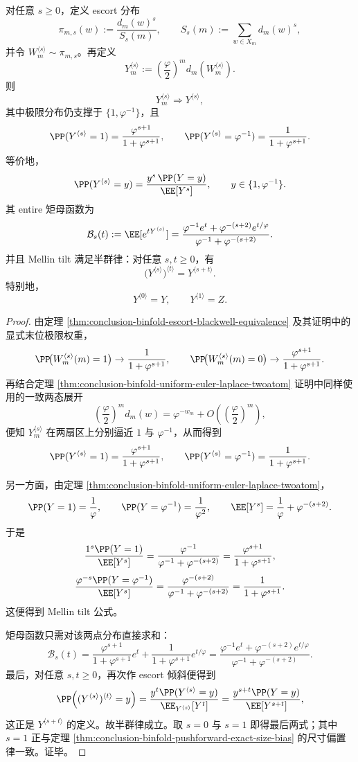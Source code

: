 \begin{theorem}\label{thm:conclusion-binfold-mellin-escort-semigroup}
对任意 \(s\ge 0\)，定义 escort 分布
\[
\pi_{m,s}(w):=\frac{d_m(w)^s}{S_s(m)},
\qquad
S_s(m):=\sum_{w\in X_m}d_m(w)^s,
\]
并令 \(W_m^{\langle s\rangle}\sim \pi_{m,s}\)。再定义
\[
Y_m^{\langle s\rangle}
:=
\left(\frac{\varphi}{2}\right)^m d_m\!\left(W_m^{\langle s\rangle}\right).
\]
则
\[
Y_m^{\langle s\rangle}\Rightarrow Y^{\langle s\rangle},
\]
其中极限分布仍支撑于 \(\{1,\varphi^{-1}\}\)，且
\[
\PP(Y^{\langle s\rangle}=1)=\frac{\varphi^{s+1}}{1+\varphi^{s+1}},
\qquad
\PP(Y^{\langle s\rangle}=\varphi^{-1})=\frac{1}{1+\varphi^{s+1}}.
\]
等价地，
\[
\PP(Y^{\langle s\rangle}=y)
=
\frac{y^s\,\PP(Y=y)}{\EE[Y^s]},
\qquad
y\in\{1,\varphi^{-1}\}.
\]
其 entire 矩母函数为
\[
\mathcal B_s(t):=\EE[e^{tY^{\langle s\rangle}}]
=
\frac{\varphi^{-1}e^t+\varphi^{-(s+2)}e^{t/\varphi}}
{\varphi^{-1}+\varphi^{-(s+2)}}.
\]
并且 Mellin tilt 满足半群律：对任意 \(s,t\ge 0\)，有
\[
\bigl(Y^{\langle s\rangle}\bigr)^{\langle t\rangle}=Y^{\langle s+t\rangle}.
\]
特别地，
\[
Y^{\langle 0\rangle}=Y,
\qquad
Y^{\langle 1\rangle}=Z.
\]
\end{theorem}
\begin{proof}
由定理 \ref{thm:conclusion-binfold-escort-blackwell-equivalence} 及其证明中的显式末位极限权重，
\[
\PP\!\bigl(W_m^{\langle s\rangle}(m)=1\bigr)\to \frac{1}{1+\varphi^{s+1}},
\qquad
\PP\!\bigl(W_m^{\langle s\rangle}(m)=0\bigr)\to \frac{\varphi^{s+1}}{1+\varphi^{s+1}}.
\]
再结合定理 \ref{thm:conclusion-binfold-uniform-euler-laplace-twoatom} 证明中同样使用的一致两态展开
\[
\left(\frac{\varphi}{2}\right)^m d_m(w)
=
\varphi^{-w_m}+O\!\left(\left(\frac{\varphi}{2}\right)^m\right),
\]
便知 \(Y_m^{\langle s\rangle}\) 在两扇区上分别逼近 \(1\) 与 \(\varphi^{-1}\)，从而得到
\[
\PP(Y^{\langle s\rangle}=1)=\frac{\varphi^{s+1}}{1+\varphi^{s+1}},
\qquad
\PP(Y^{\langle s\rangle}=\varphi^{-1})=\frac{1}{1+\varphi^{s+1}}.
\]

另一方面，由定理 \ref{thm:conclusion-binfold-uniform-euler-laplace-twoatom}，
\[
\PP(Y=1)=\frac{1}{\varphi},
\qquad
\PP(Y=\varphi^{-1})=\frac{1}{\varphi^2},
\qquad
\EE[Y^s]=\frac{1}{\varphi}+\varphi^{-(s+2)}.
\]
于是
\[
\frac{1^s\PP(Y=1)}{\EE[Y^s]}
=
\frac{\varphi^{-1}}{\varphi^{-1}+\varphi^{-(s+2)}}
=
\frac{\varphi^{s+1}}{1+\varphi^{s+1}},
\]
\[
\frac{\varphi^{-s}\PP(Y=\varphi^{-1})}{\EE[Y^s]}
=
\frac{\varphi^{-(s+2)}}{\varphi^{-1}+\varphi^{-(s+2)}}
=
\frac{1}{1+\varphi^{s+1}}.
\]
这便得到 Mellin tilt 公式。

矩母函数只需对该两点分布直接求和：
\[
\mathcal B_s(t)
=
\frac{\varphi^{s+1}}{1+\varphi^{s+1}}e^t
+
\frac{1}{1+\varphi^{s+1}}e^{t/\varphi}
=
\frac{\varphi^{-1}e^t+\varphi^{-(s+2)}e^{t/\varphi}}
{\varphi^{-1}+\varphi^{-(s+2)}}.
\]
最后，对任意 \(s,t\ge 0\)，再次作 escort 倾斜便得到
\[
\PP\!\left((Y^{\langle s\rangle})^{\langle t\rangle}=y\right)
=
\frac{y^t\PP(Y^{\langle s\rangle}=y)}{\EE_{Y^{\langle s\rangle}}[Y^t]}
=
\frac{y^{s+t}\PP(Y=y)}{\EE[Y^{s+t}]},
\]
这正是 \(Y^{\langle s+t\rangle}\) 的定义。故半群律成立。取 \(s=0\) 与 \(s=1\) 即得最后两式；其中 \(s=1\) 正与定理 \ref{thm:conclusion-binfold-pushforward-exact-size-bias} 的尺寸偏置律一致。证毕。
\end{proof}

